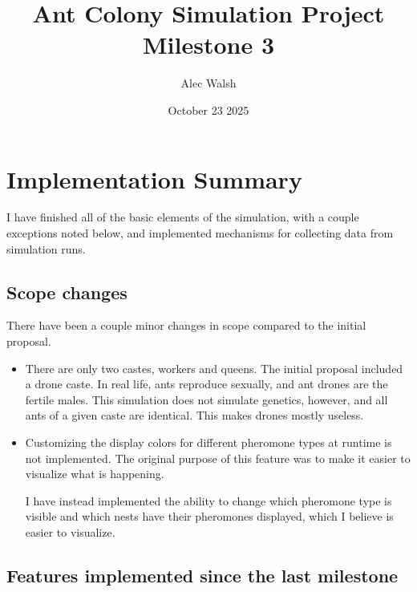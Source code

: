 \documentclass{article}
\title{Ant Colony Simulation Project Milestone 3}
\author{Alec Walsh}
\date{October 23 2025}
\begin{document}
\maketitle

\section{Implementation Summary}

I have finished all of the basic elements of the simulation, with a couple exceptions noted below, and implemented mechanisms for collecting data from simulation runs.

\subsection{Scope changes}

There have been a couple minor changes in scope compared to the initial proposal.

\begin{itemize}
\item There are only two castes, workers and queens.  The initial proposal included a drone caste.  In real life, ants reproduce sexually, and ant drones are the fertile males.  This simulation does not simulate genetics, however, and all ants of a given caste are identical.  This makes drones mostly useless.
\item Customizing the display colors for different pheromone types at runtime is not implemented.  The original purpose of this feature was to make it easier to visualize what is happening.

I have instead implemented the ability to change which pheromone type is visible and which nests have their pheromones displayed, which I believe is easier to visualize.
\end{itemize}

\subsection{Features implemented since the last milestone}
\end{document}
